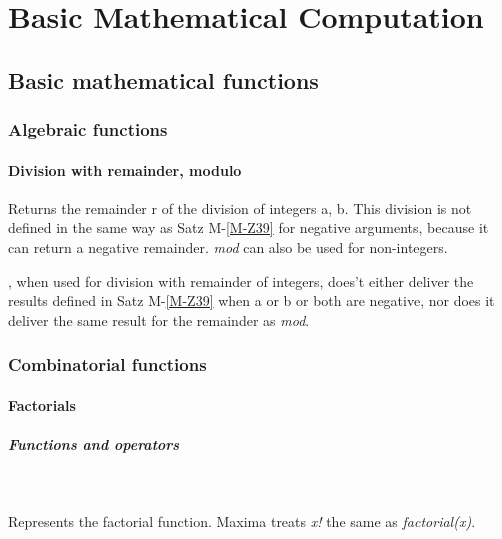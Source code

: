 \documentclass[../Maxima_Workbook.tex]{subfiles}
\begin{document}
	
\part{Basic Mathematical Computation}

\chapter{Basic mathematical functions}

\section{Algebraic functions}

\subsection{Division with remainder, modulo}

\lz {} \hfill \tcr{[function]}

\lz Returns the remainder r of the division  of integers a, b. This division is not defined in the same way as Satz M-\ref{M-Z39} for negative arguments, because it can return a negative remainder. \emph{mod} can also be used for non-integers.

\lz {}, when used for division with remainder of integers, does't either deliver the results defined in Satz M-\ref{M-Z39} when a or b or both are negative, nor does it deliver the same result for the remainder as \emph{mod}. 

\section{Combinatorial functions}

\subsection{Factorials}

\subsubsection{Functions and operators}

\lz {} \hfill \tcr{[function]} \\
 \hfill \tcr{[operator]}

\lz Represents the factorial function. Maxima treats \emph{x!} the same as \emph{factorial(x)}.
\end{document}
